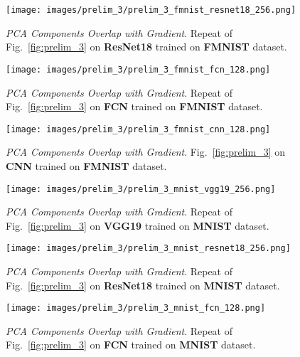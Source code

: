 \begin{figure}[h!]
  \centering
  \centerline{\texttt{[image: images/prelim\_3/prelim\_3\_fmnist\_resnet18\_256.png]}}
  \caption{\small{\textit{PCA Components Overlap with Gradient}. Repeat of Fig.~\ref{fig:prelim_3} on \textbf{ResNet18} trained on \textbf{FMNIST} dataset.}}
  \label{fig:prelim_3_fmnist_resnet18}
\end{figure}

\begin{figure}[h!]
  \centering
  \centerline{\texttt{[image: images/prelim\_3/prelim\_3\_fmnist\_fcn\_128.png]}}
  \caption{\small{\textit{PCA Components Overlap with Gradient}. Repeat of Fig.~\ref{fig:prelim_3} on \textbf{FCN} trained on \textbf{FMNIST} dataset.}}
  \label{fig:prelim_3_fmnist_fcn}
\end{figure}

\begin{figure}[h!]
  \centering
  \centerline{\texttt{[image: images/prelim\_3/prelim\_3\_fmnist\_cnn\_128.png]}}
  \caption{\small{\textit{PCA Components Overlap with Gradient}. Fig.~\ref{fig:prelim_3} on \textbf{CNN} trained on \textbf{FMNIST} dataset.}}
  \label{fig:prelim_3_fmnist_cnn}
\end{figure}


\begin{figure}[h!]
  \centering
  \centerline{\texttt{[image: images/prelim\_3/prelim\_3\_mnist\_vgg19\_256.png]}}
  \caption{\small{\textit{PCA Components Overlap with Gradient}. Repeat of Fig.~\ref{fig:prelim_3} on \textbf{VGG19} trained on \textbf{MNIST} dataset.}}
  \label{fig:prelim_3_mnist_vgg19}
\end{figure}

\begin{figure}[h!]
  \centering
  \centerline{\texttt{[image: images/prelim\_3/prelim\_3\_mnist\_resnet18\_256.png]}}
  \caption{\small{\textit{PCA Components Overlap with Gradient}. Repeat of Fig.~\ref{fig:prelim_3} on \textbf{ResNet18} trained on \textbf{MNIST} dataset.}}
  \label{fig:prelim_3_mnist_resnet18}
\end{figure}

\begin{figure}[h!]
  \centering
  \centerline{\texttt{[image: images/prelim\_3/prelim\_3\_mnist\_fcn\_128.png]}}
  \caption{\small{\textit{PCA Components Overlap with Gradient}. Repeat of Fig.~\ref{fig:prelim_3} on \textbf{FCN} trained on \textbf{MNIST} dataset.}}
  \label{fig:prelim_3_mnist_fcn}
\end{figure}

